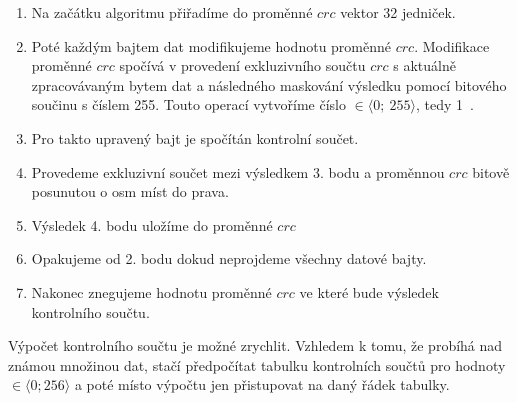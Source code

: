 

\begin{enumerate}
    \item Na začátku algoritmu přiřadíme do proměnné $crc$ vektor 32 jedniček.
    \item Poté každým bajtem dat modifikujeme hodnotu proměnné $crc$. Modifikace proměnné $crc$ spočívá v provedení exkluzivního součtu $crc$ s aktuálně zpracovávaným bytem dat a následného maskování výsledku pomocí bitového součinu s číslem 255. Touto operací vytvoříme číslo $\in \langle 0;~255 \rangle$, tedy 1~.
    \item Pro takto upravený bajt je spočítán kontrolní součet.
    \item Provedeme exkluzivní součet mezi výsledkem 3. bodu a proměnnou $crc$ bitově posunutou o osm míst do prava.
    \item Výsledek 4. bodu uložíme do proměnné $crc$
    \item Opakujeme od 2. bodu dokud neprojdeme všechny datové bajty.
    \item Nakonec znegujeme hodnotu proměnné $crc$ ve které bude výsledek kontrolního součtu.
\end{enumerate}


Výpočet kontrolního součtu je možné zrychlit. Vzhledem k tomu, že probíhá nad známou množinou dat, stačí předpočítat tabulku kontrolních součtů pro hodnoty $\in \langle 0; 256 \rangle$ a poté místo výpočtu jen přistupovat na daný řádek tabulky.
